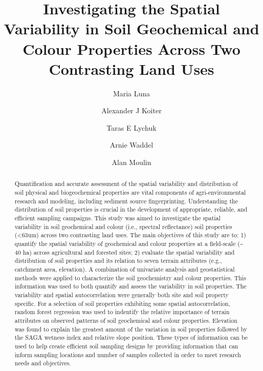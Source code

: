 \documentclass[
  number]{elsarticle}
\begin{document}
\begin{frontmatter}
\title{Investigating the Spatial Variability in Soil Geochemical and
Colour Properties Across Two Contrasting Land Uses}
\author[1]{Maria Luna%
%
}
\author[2]{Alexander J Koiter%
%
}
\author[3]{Taras E Lychuk%
%
}
\author[3]{Arnie Waddel%
%
}
\author[3]{Alan Moulin%
%
}







        
\begin{abstract}
Quantification and accurate assessment of the spatial variability and
distribution of soil physical and biogeochemical properties are vital
components of agri-environmental research and modeling, including
sediment source fingerprinting. Understanding the distribution of soil
properties is crucial in the development of appropriate, reliable, and
efficient sampling campaigns. This study was aimed to investigate the
spatial variability in soil geochemical and colour (i.e., spectral
reflectance) soil properties (\textless63um) across two contrasting land
uses. The main objectives of this study are to: 1) quantify the spatial
variability of geochemical and colour properties at a field-scale
(\textasciitilde{} 40 ha) across agricultural and forested sites; 2)
evaluate the spatial variability and distribution of soil properties and
its relation to seven terrain attributes (e.g., catchment area,
elevation). A combination of univariate analysis and geostatistical
methods were applied to characterize the soil geochemistry and colour
properties. This information was used to both quantify and assess the
variability in soil properties. The variability and spatial
autocorrelation were generally both site and soil property specific. For
a selection of soil properties exhibiting some spatial autocorrelation,
random forest regression was used to indentify the relative importance
of terrain attributes on observed patterns of soil geochemical and
colour properties. Elevation was found to explain the greatest amount of
the variation in soil properties followed by the SAGA wetness index and
relative slope position. These types of information can be used to help
create efficient soil sampling designs by providing information that can
inform sampling locations and number of samples collected in order to
meet research needs and objectives.
\end{abstract}






\end{frontmatter}
\end{document}
